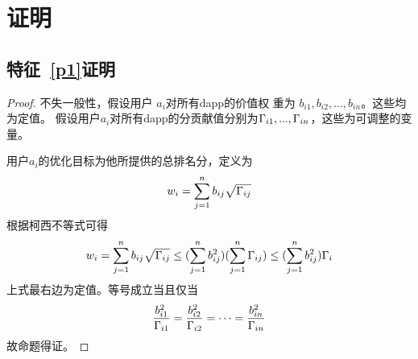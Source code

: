 \section{证明}
\subsection{特征~\ref{p1}证明}
\label{subsection:proof1}
\begin{proof}

不失一般性，假设用户 $a_i$对所有dapp的价值权
重为 $b_{i1}, b_{i2}, ..., b_{in}$。这些均为定值。
假设用户$a_i$对所有dapp的分贡献值分别为$\Gamma_{i1},...,\Gamma_{in}$，这些为可调整的变量。

用户$a_i$的优化目标为他所提供的总排名分，定义为
$$w_i = \sum_{j=1}^n b_{ij}\sqrt{\Gamma_{ij}}$$
根据柯西不等式可得
$$w_i = \sum_{j=1}^n b_{ij}\sqrt{\Gamma_{ij}} \leq (\sum_{j=1}^n b_{ij}^2)(\sum_{j=1}^n \Gamma_{ij}) \leq (\sum_{j=1}^n b_{ij}^2)\Gamma_i$$
上式最右边为定值。等号成立当且仅当
$$\frac{b_{i1}^2}{\Gamma_{i1}}=\frac{b_{i2}^2}{\Gamma_{i2}}=\cdots=\frac{b_{in}^2}{\Gamma_{in}}$$
故命题得证。

\end{proof}

